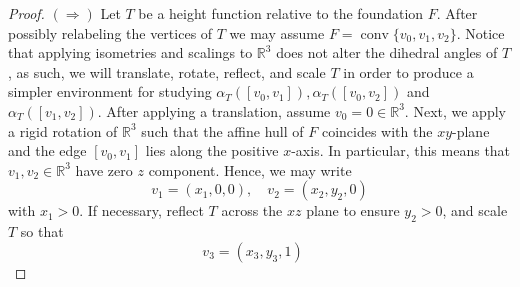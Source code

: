 \documentclass{mainresearch}
\begin{document}
\begin{proof}
	$(\Rightarrow)$ Let $T$ be a height function relative to the foundation $F$. After possibly relabeling the vertices of $T$ we may assume $F = \operatorname{conv}\{v_0,v_1,v_2\}$. Notice that applying isometries and scalings to $\mathbb{R}^3$ does not alter the dihedral angles of $T$, as such, we will translate, rotate, reflect, and scale $T$ in order to produce a simpler environment for studying $\alpha_T([v_0,v_1]), \alpha_T([v_0,v_2])$ and $\alpha_T([v_1,v_2])$. After applying a translation, assume $v_0 = 0 \in \mathbb{R}^3$. Next, we apply a rigid rotation of $\mathbb{R}^3$ such that the affine hull of $F$ coincides with the $xy$-plane and the edge $[v_0,v_1]$ lies along the positive $x$-axis. In particular, this means that $v_1,v_2 \in \mathbb{R}^3$ have zero $z$ component. Hence, we may write
	\begin{equation*}
		v_1 = (x_1,0,0), \quad v_2 = (x_2,y_2,0)
	\end{equation*}
	with $x_1>0$. If necessary, reflect $T$ across the $xz$ plane to ensure $y_2>0$, and scale $T$ so that
	\begin{equation*}
		v_3 = (x_3,y_3,1)\quad
	\end{equation*}
	

\end{proof}
\end{document}
